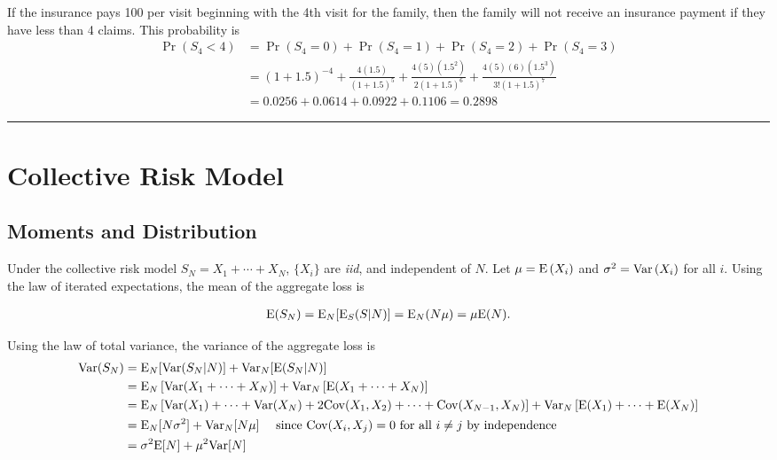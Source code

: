 \documentclass[]{book}
\theoremstyle{definition}
\theoremstyle{definition}
\theoremstyle{definition}
\theoremstyle{remark}
\begin{document}
If the insurance pays 100 per visit beginning with the 4th visit for the
family, then the family will not receive an insurance payment if they
have less than 4 claims. This probability is \[\begin{aligned}
    \Pr(S_4 < 4) &= \Pr(S_4 = 0) + \Pr(S_4 = 1) + \Pr(S_4 = 2) +\Pr(S_4 = 3) \\
    &= (1+1.5)^{-4} + \frac{4(1.5)}{(1+1.5)^5} + \frac{4(5)(1.5^2)}{2(1+1.5)^6} + \frac{4(5)(6)(1.5^3)}{3!(1+1.5)^7}\\
    &= 0.0256 + 0.0614 + 0.0922 + 0.1106 = 0.2898
\end{aligned}\]

\begin{center}\rule{0.5\linewidth}{\linethickness}\end{center}

\section{Collective Risk Model}\label{collective-risk-model}

\subsection{Moments and Distribution}\label{moments-and-distribution}

Under the collective risk model \(S_N=X_1+\cdots+X_N\), \(\{X_i\}\) are
\emph{iid}, and independent of \(N\). Let
\(\mu = {\rm E}\left( X_{i}\right)\) and
\(\sigma ^{2} = {\rm Var}\left(X_{i}\right)\) for all \(i\). Using the
law of iterated expectations, the mean of the aggregate loss is

\begin{eqnarray*}
{\rm E}(S_N)={\rm E}_N[{\rm E}_S(S|N)] = {\rm E}_N(N\mu) = \mu {\rm E}(N).
\end{eqnarray*}

Using the law of total variance, the variance of the aggregate loss is
\[\begin{aligned}
{\rm Var}(S_N) &= {\rm E}_N[{\rm Var}(S_N|N)] + {\rm Var}_N[{\rm E}(S_N|N)] \\
&= \mathrm{E}_N \left[ \mathrm{Var}(X_1+\cdots+X_N) \right] + \mathrm{Var}_N\left[ \mathrm{E}(X_1+\cdots+X_N) \right] \\
&= \mathrm{E}_N \left[ \mathrm{Var}(X_1)+\cdots+ \mathrm{Var}(X_N) + 2\mathrm{Cov}(X_1, X_2) + \cdots + \mathrm{Cov}(X_{N-1}, X_N) \right] + \mathrm{Var}_N\left[ \mathrm{E}(X_1) + \cdots + \mathrm{E}(X_N) \right]  \\
&={\rm E}_N[N\sigma^2] + {\rm Var}_N[N\mu] ~~~~ \text{since } \mathrm{Cov}(X_i, X_j)=0 \text{ for all } i\neq j \text{ by independence} \\
&=\sigma^2{\rm E}[N] + \mu^2{\rm Var}[N]
\end{aligned}\]
\end{document}
